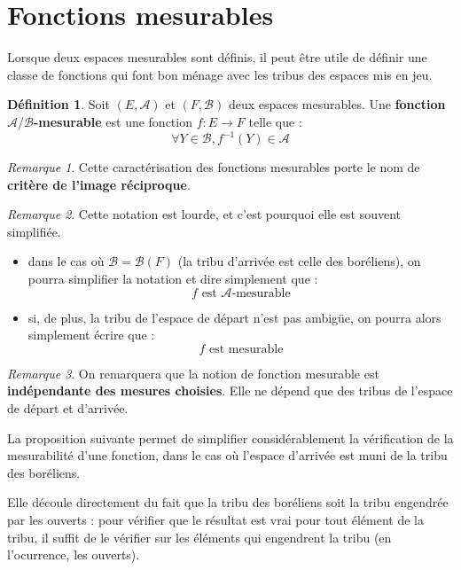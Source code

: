 \documentclass[french]{report}
\theoremstyle{plain}
\theoremstyle{definition}
\newtheorem{defi}{Définition}[section]
\theoremstyle{remark}
\newtheorem{rem}{Remarque}[section]
\newcommand\itemb{\item[$\bullet$]}
\begin{document}
\section{Fonctions mesurables}

Lorsque deux espaces mesurables sont définis, il peut être utile de définir une classe de fonctions qui font bon ménage avec les tribus des espaces mis en jeu.

\begin{defi}
  Soit $\left(E, \mathcal{A}\right)$ et $\left(F, \mathcal{B}\right)$ deux espaces mesurables.
  Une \textbf{fonction } $\mathcal{A}$/$\mathcal{B}$\textbf{-mesurable} est une fonction $f : E \longrightarrow F$ telle que :
  $$ \forall Y \in \mathcal{B}, f^{-1}(Y) \in \mathcal{A} $$
\end{defi}

\begin{rem}
  Cette caractérisation des fonctions mesurables porte le nom de \textbf{critère de l'image réciproque}.
\end{rem}

\begin{rem}
  Cette notation est lourde, et c'est pourquoi elle est souvent simplifiée.
  \begin{itemize}
  \itemb dans le cas où $\mathcal{B}=\mathcal{B}\left(F\right)$ (la tribu d'arrivée est celle des boréliens), on pourra simplifier la notation et dire simplement que :
  $$
  f \text{ est } \mathcal{A}\text{-mesurable}
  $$
  \itemb si, de plus, la tribu de l'espace de départ n'est pas ambigüe, on pourra alors simplement écrire que :
  $$
  f \text{ est mesurable}
  $$
  \end{itemize}
\end{rem}

\begin{rem}
  On remarquera que la notion de fonction mesurable est \textbf{indépendante des mesures choisies}.
  Elle ne dépend que des tribus de l'espace de départ et d'arrivée.
\end{rem}

La proposition suivante permet de simplifier considérablement la vérification de la mesurabilité d'une fonction, dans le cas où l'espace d'arrivée est muni de la tribu des boréliens.

Elle découle directement du fait que la tribu des boréliens soit la tribu engendrée par les ouverts :
pour vérifier que le résultat est vrai pour tout élément de la tribu, il suffit de le vérifier sur les éléments qui engendrent la tribu (en l'ocurrence, les ouverts).
\end{document}
